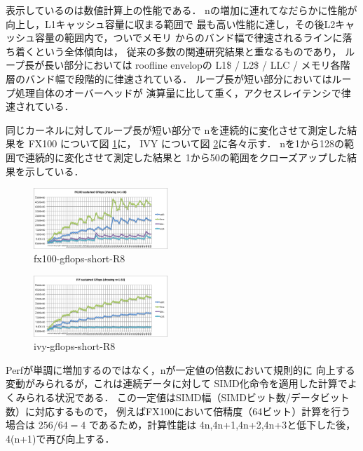 \documentclass[submit,techrep,noauthor]{ipsj}
\begin{document}
表示しているのは数値計算上の性能である．
nの増加に連れてなだらかに性能が向上し，L1キャッシュ容量に収まる範囲で
最も高い性能に達し，その後L2キャッシュ容量の範囲内で，ついでメモリ
からのバンド幅で律速されるラインに落ち着くという全体傾向は，
従来の多数の関連研究結果と重なるものであり，
ループ長が長い部分においては roofline envelopの
L1\$ / L2\$ / LLC / メモリ各階層のバンド幅で段階的に律速されている．
ループ長が短い部分においてはループ処理自体のオーバーヘッドが
演算量に比して重く，アクセスレイテンシで律速されている．
\cite{Williams:2009:RIV:1498765.1498785} 

同じカーネルに対してループ長が短い部分で
nを連続的に変化させて測定した結果を
FX100 について図 \ref{fig:fx100-gflops-short-R8}に，
IVY について図 \ref{fig:ivy-gflops-short-R8}に各々示す．
nを1から128の範囲で連続的に変化させて測定した結果と
1から50の範囲をクローズアップした結果を示している．

\begin{figure}[bt]
\centering\includegraphics[width=0.45\textwidth]{figs/fx100-gflops-short-R8}
\caption{fx100-gflops-short-R8}
\label{fig:fx100-gflops-short-R8}
\end{figure}

\begin{figure}[bt]
\centering\includegraphics[width=0.45\textwidth]{figs/ivy-gflops-short-R8}
\caption{ivy-gflops-short-R8}
\label{fig:ivy-gflops-short-R8}
\end{figure}

Perfが単調に増加するのではなく，nが一定値の倍数において規則的に
向上する変動がみられるが，これは連続データに対して
SIMD化命令を適用した計算でよくみられる状況である．
この一定値はSIMD幅（SIMDビット数/データビット数）に対応するもので，
例えばFX100において倍精度（64ビット）計算を行う場合は
\begin{math}
256 / 64 = 4
\end{math}
であるため，計算性能は
4n,4n+1,4n+2,4n+3と低下した後，4(n+1)で再び向上する．
\end{document}
